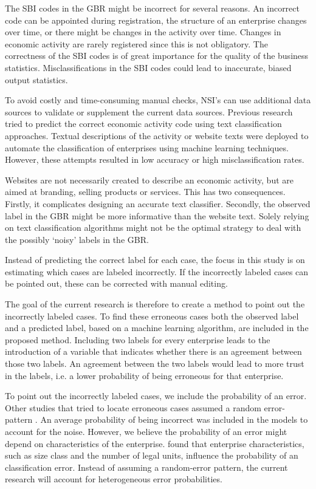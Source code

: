 \documentclass[12pt, a4paper, titlepage]{article}
\begin{document}
The SBI codes in the GBR might be incorrect for several reasons. An incorrect code can be appointed during registration, the structure of an enterprise changes over time, or there might be changes in the activity over time. Changes in economic activity are rarely registered \citep{Christensen2008, DeldenScholtusBurger} since this is not obligatory. The correctness of the SBI codes is of great importance for the quality of the business statistics. Misclassifications in the SBI codes could lead to inaccurate, biased output statistics.

To avoid costly and time-consuming manual checks, NSI’s can use additional data sources to validate or supplement the current data sources. Previous research tried to predict the correct economic activity code using text classification approaches. Textual descriptions of the activity \citep{Caterini} or website texts \citep{Roelands, Berardi, Heidi} were deployed to automate the classification of enterprises using machine learning techniques. However, these attempts resulted in low accuracy or high misclassification rates. 

Websites are not necessarily created to describe an economic activity, but are aimed at branding, selling products or services. This has two consequences. Firstly, it complicates designing an accurate text classifier. Secondly, the observed label in the GBR might be more informative than the website text. Solely relying on text classification algorithms might not be the optimal strategy to deal with the possibly ‘noisy’ labels in the GBR.

Instead of predicting the correct label for each case, the focus in this study is on estimating which cases are labeled incorrectly. If the incorrectly labeled cases can be pointed out, these can be corrected with manual editing. 

The goal of the current research is therefore to create a method to point out the incorrectly labeled cases. To find these erroneous cases both the observed label and a predicted label, based on a machine learning algorithm, are included in the proposed method. Including two labels for every enterprise leads to the introduction of a variable that indicates whether there is an agreement between those two labels. An agreement between the two labels would lead to more trust in the labels, i.e. a lower probability of being erroneous for that enterprise.

To point out the incorrectly labeled cases, we include the probability of an error. Other studies that tried to locate erroneous cases assumed a random error-pattern \citep{Sigurdsson,Eskin,DiZio}. An average probability of being incorrect was included in the models to account for the noise. However, we believe the probability of an error might depend on characteristics of the enterprise. \citet{DeldenScholtusBurger} found that enterprise characteristics, such as size class and the number of legal units, influence the probability of an classification error. Instead of assuming a random-error pattern, the current research will account for heterogeneous error probabilities.
\end{document}

